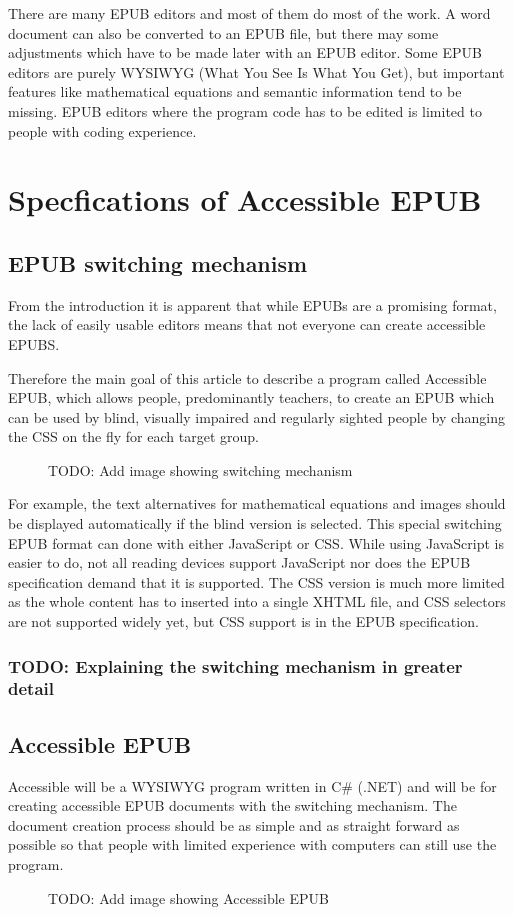 \documentclass{article}
\begin{document}
There are many EPUB editors and most of them do most of the work. A word document can also be converted to an EPUB file, but there may some adjustments which have to be made later with an EPUB editor. 
Some EPUB editors are purely WYSIWYG (What You See Is What You Get), but important features like mathematical equations and semantic information tend to be missing. EPUB editors where the program code has to be edited is limited to people with coding experience.


\section{Specfications of Accessible EPUB}

\subsection{EPUB switching mechanism}

From the introduction it is apparent that while EPUBs are a promising format, the lack of easily usable editors means that not everyone can create accessible EPUBS.

Therefore the main goal of this article to describe a program called Accessible EPUB, which allows people, predominantly teachers, to create an EPUB which can be used by blind, visually impaired and regularly sighted people by changing the CSS on the fly for each target group. 


\begin{figure}
	\caption{TODO: Add image showing switching mechanism}
\end{figure}


For example, the text alternatives for mathematical equations and images should be displayed automatically if the blind version is selected. This special switching EPUB format can done with either JavaScript or CSS. While using JavaScript is easier to do, not all reading devices support JavaScript nor does the EPUB specification demand that it is supported. \cite{EPUB3bp} The CSS version is much more limited as the whole content has to inserted into a single XHTML file, and CSS selectors are not supported widely yet, but CSS support is in the EPUB specification.
\subsubsection{TODO: Explaining the switching mechanism in greater detail}
\subsection{Accessible EPUB}
Accessible will be a WYSIWYG program written in C\# (.NET) and will be for creating accessible EPUB documents with the switching mechanism. The document creation process should be as simple and as straight forward as possible so that people with limited experience with computers can still use the program. 



\begin{figure}
	\caption{TODO: Add image showing Accessible EPUB}
\end{figure}





\end{document}

